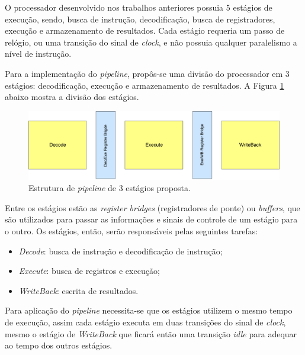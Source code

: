\documentclass[11pt,a4paper,titlepage]{article}
\begin{document}
O processador desenvolvido nos trabalhos anteriores possuia 5 estágios de execução, sendo, busca de instrução, decodificação, busca de registradores, execução e armazenamento de resultados. Cada estágio requeria um passo de relógio, ou uma transição do sinal de \textit{clock}, e não possuia qualquer paralelismo a nível de instrução.

Para a implementação do \textit{pipeline}, propôs-se uma divisão do processador em 3 estágios: decodificação, execução e armazenamento de resultados. A Figura \ref{fig:pipeline3stage} abaixo mostra a divisão dos estágios.

\begin{figure}[!h]
\centering
\includegraphics[scale=0.4]{images/pipeline.pdf}
\caption{Estrutura de \textit{pipeline} de 3 estágios proposta.}
\label{fig:pipeline3stage}
\end{figure}

Entre os estágios estão as \textit{register bridges} (registradores de ponte) ou \textit{buffers}, que são utilizados para passar as informações e sinais de controle de um estágio para o outro. Os estágios, então, serão responsáveis pelas seguintes tarefas:

\begin{itemize}

\item \textit{Decode}: busca de instrução e decodificação de instrução;

\item \textit{Execute}: busca de registros e execução;

\item \textit{WriteBack}: escrita de resultados.

\end{itemize}

Para aplicação do \textit{pipeline} necessita-se que os estágios utilizem o mesmo tempo de execução, assim cada estágio executa em duas transições do sinal de \textit{clock}, mesmo o estágio de \textit{WriteBack} que ficará então uma transição \textit{idle} para adequar ao tempo dos outros estágios.
\end{document}
